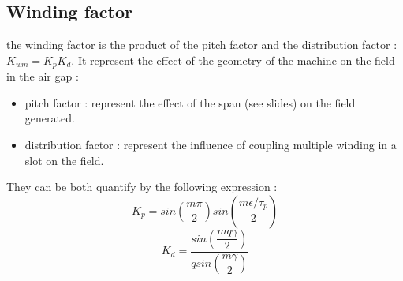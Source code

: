 \subsection{Winding factor}
the winding factor is the product of the pitch factor and the distribution factor : $K_{wm}=K_{p}K_{d}$. It represent the effect of the geometry of the machine on the field in the air gap :
\begin{itemize}
    \item pitch factor : represent the effect of the span (see slides) on the field generated.
    \item distribution factor : represent the influence of coupling multiple winding in a slot on the field.
\end{itemize}
They can be both quantify by the following expression : 
\begin{equation}
    K_{p}=sin\left(\dfrac{m\pi}{2}\right)sin\left(\dfrac{m\epsilon /\tau_{p}}{2}\right)
\end{equation}
\begin{equation}
    K_{d}=\dfrac{sin\left(\dfrac{mq\gamma}{2}\right)}{qsin\left(\dfrac{m\gamma}{2}\right)}
\end{equation}

